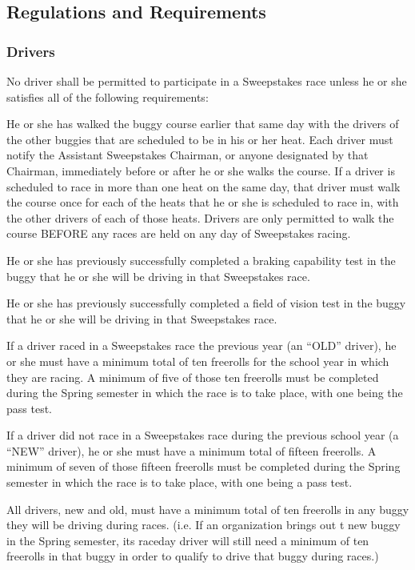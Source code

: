 \documentclass[openany]{book}
\begin{document}
\subsection{Regulations and Requirements}

\subsubsection{Drivers}

No driver shall be permitted to participate in a Sweepstakes race unless he or she satisfies all of the following requirements:

He or she has walked the buggy course earlier that same day with the drivers of the other buggies that are scheduled to be in his or her heat. Each driver must notify the Assistant Sweepstakes Chairman, or anyone designated by that Chairman, immediately before or after he or she walks the course. If a driver is scheduled to race in more than one heat on the same day, that driver must walk the course once for each of the heats that he or she is scheduled to race in, with the other drivers of each of those heats. Drivers are only permitted to walk the course BEFORE any races are held on any day of Sweepstakes racing.

He or she has previously successfully completed a braking capability test in the buggy that he or she will be driving in that Sweepstakes race.

He or she has previously successfully completed a field of vision test in the buggy that he or she will be driving in that Sweepstakes race.

If a driver raced in a Sweepstakes race the previous year (an ``OLD'' driver), he or she must have a minimum total of ten freerolls for the school year in which they are racing. A minimum of five of those ten freerolls must be completed during the Spring semester in which the race is to take place, with one being the pass test.

If a driver did not race in a Sweepstakes race during the previous school year (a ``NEW'' driver), he or she must have a minimum total of fifteen freerolls. A minimum of seven of those fifteen freerolls must be completed during the Spring semester in which the race is to take place, with one being a pass test.

All drivers, new and old, must have a minimum total of ten freerolls in any buggy they will be driving during races. (i.e. If an organization brings out t new buggy in the Spring semester, its raceday driver will still need a minimum of ten freerolls in that buggy in order to qualify to drive that buggy during races.)
\end{document}

